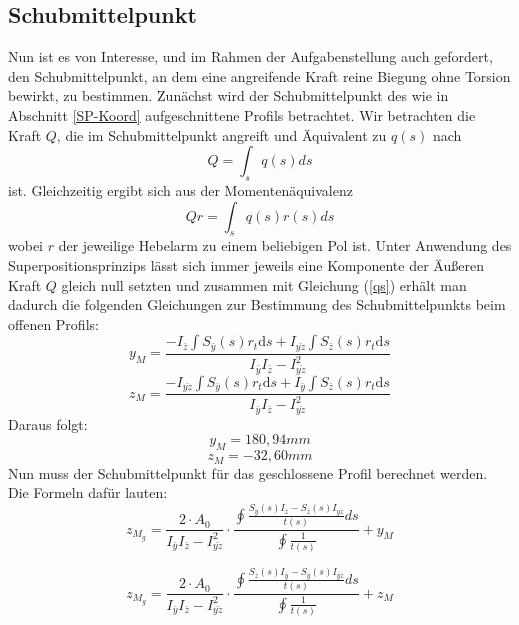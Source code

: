 \subsection{Schubmittelpunkt}
Nun ist es von Interesse, und im Rahmen der Aufgabenstellung auch gefordert, den Schubmittelpunkt, an dem eine angreifende Kraft reine Biegung ohne Torsion bewirkt, zu bestimmen.
Zunächst wird der Schubmittelpunkt des wie in Abschnitt \ref{SP-Koord} aufgeschnittene Profils betrachtet. Wir betrachten die Kraft $Q$, die im Schubmittelpunkt angreift und Äquivalent zu $q(s)$ nach
\begin{equation}
	Q=\int_{s}^{}q(s)ds
\end{equation}
ist. Gleichzeitig ergibt sich aus der Momentenäquivalenz 
\begin{equation}
	Qr=\int_{s}q(s)r(s)ds
\end{equation}
wobei $r$ der jeweilige Hebelarm zu einem beliebigen Pol ist. Unter Anwendung des Superpositionsprinzips lässt sich immer jeweils eine Komponente der Äußeren Kraft $Q$ gleich null setzten und zusammen mit Gleichung (\ref{qs}) erhält man dadurch die folgenden Gleichungen zur Bestimmung des Schubmittelpunkts beim offenen Profils:
\begin{equation}
	y_{M}=\frac{-I_{\bar{z}}\int S_{\bar{y}}(s) r_{t}\mathrm{d}s+I_{\bar{yz}}\int S_{\bar{z}}(s) r_{t}\mathrm{d}s}{I_{\bar{y}}I_{\bar{z}}-I_{\bar{yz}}^2}
\end{equation}
\begin{equation}
	z_{M}=\frac{-I_{\bar{yz}}\int S_{\bar{y}}(s) r_{t}\mathrm{d}s+I_{\bar{y}}\int S_{\bar{z}}(s) r_{t}\mathrm{d}s}{I_{\bar{y}}I_{\bar{z}}-I_{\bar{yz}}^2}
\end{equation}
Daraus folgt:
\begin{equation}
	y_{M}=180,94mm
\end{equation}
\begin{equation}
	z_{M}=-32,60mm
\end{equation}
Nun muss der Schubmittelpunkt für das geschlossene Profil berechnet werden. Die Formeln dafür lauten:
\begin{equation}
	z_{M_{g}}=
	\frac{2\cdot A_{0}}{I_{\bar{y}}I_{\bar{z}}-I_{\bar{yz}}^2}
	\cdot\frac{
		\oint
		\frac{
			S_{\bar{y}}(s)I_{\bar{z}}-S_{\bar{z}}(s)I_{\bar{yz}}
		}
		{t(s)} ds
	}
	{\oint\frac{1}{t(s)}} +y_{M}
\end{equation}

\begin{equation}
	z_{M_{g}}=
	\frac{2\cdot A_{0}}{I_{\bar{y}}I_{\bar{z}}-I_{\bar{yz}}^2}
	\cdot\frac{
		\oint
		\frac{
			S_{\bar{z}}(s)I_{\bar{y}}-S_{\bar{y}}(s)I_{\bar{yz}}
		}
		{t(s)} ds
	}
	{\oint\frac{1}{t(s)}} +z_{M} 
\end{equation}

